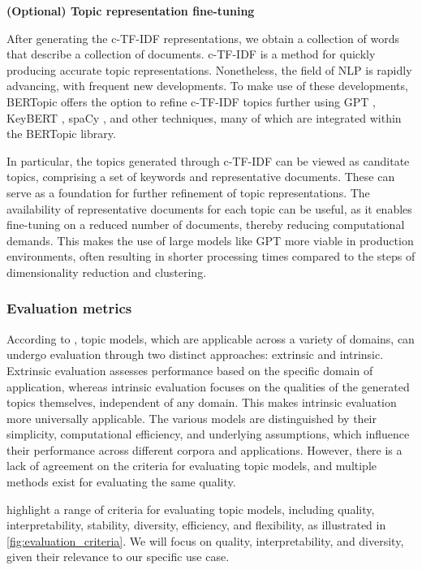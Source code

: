 \documentclass{article}
\begin{document}
\textbf{(Optional) Topic representation fine-tuning}

After generating the c-TF-IDF representations, we obtain a collection of words that describe a collection of documents. c-TF-IDF is a method for quickly producing accurate topic representations. Nonetheless, the field of NLP is rapidly advancing, with frequent new developments. To make use of these developments, BERTopic offers the option to refine c-TF-IDF topics further using GPT \cite{radford_improving_nodate, radford_language_nodate, brown_language_2020}, KeyBERT \cite{grootendorst_maartengrkeybert_2024}, spaCy \cite{noauthor_explosionspacy_nodate}, and other techniques, many of which are integrated within the BERTopic library.

In particular, the topics generated through c-TF-IDF can be viewed as canditate topics, comprising a set of keywords and representative documents. These can serve as a foundation for further refinement of topic representations. The availability of representative documents for each topic can be useful, as it enables fine-tuning on a reduced number of documents, thereby reducing computational demands. This makes the use of large models like GPT more viable in production environments, often resulting in shorter processing times compared to the steps of dimensionality reduction and clustering.

\subsubsection{Evaluation metrics}

According to \citet{abdelrazek_topic_2022}, topic models, which are applicable across a variety of domains, can undergo evaluation through two distinct approaches: extrinsic and intrinsic. Extrinsic evaluation assesses performance based on the specific domain of application, whereas intrinsic evaluation focuses on the qualities of the generated topics themselves, independent of any domain. This makes intrinsic evaluation more universally applicable. The various models are distinguished by their simplicity, computational efficiency, and underlying assumptions, which influence their performance across different corpora and applications. However, there is a lack of agreement on the criteria for evaluating topic models, and multiple methods exist for evaluating the same quality.

\citet{abdelrazek_topic_2022} highlight a range of criteria for evaluating topic models, including quality, interpretability, stability, diversity, efficiency, and flexibility, as illustrated in \cref{fig:evaluation_criteria}. We will focus on quality, interpretability, and diversity, given their relevance to our specific use case.
\end{document}
